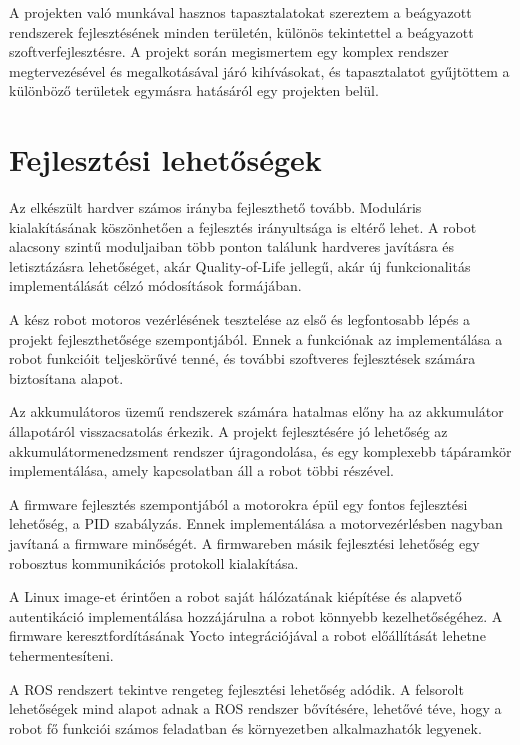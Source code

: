 \medskip

A projekten való munkával hasznos tapasztalatokat szereztem a beágyazott
rendszerek fejlesztésének minden területén, különös tekintettel a beágyazott
szoftverfejlesztésre. A projekt során megismertem egy komplex rendszer
megtervezésével és megalkotásával járó kihívásokat, és tapasztalatot gyűjtöttem a
különböző területek egymásra hatásáról egy projekten belül.

\section{Fejlesztési lehetőségek}

Az elkészült hardver számos irányba fejleszthető tovább. Moduláris kialakításának
köszönhetően a fejlesztés irányultsága is eltérő lehet. A robot alacsony szintű
moduljaiban több ponton találunk hardveres javításra és letisztázásra
lehetőséget, akár Quality-of-Life jellegű, akár új funkcionalitás implementálását
célzó módosítások formájában.

\medskip

A kész robot motoros vezérlésének tesztelése az első és legfontosabb lépés a
projekt fejleszthetősége szempontjából. Ennek a funkciónak az implementálása a
robot funkcióit teljeskörűvé tenné, és további szoftveres fejlesztések számára
biztosítana alapot.

Az akkumulátoros üzemű rendszerek számára hatalmas előny ha az akkumulátor
állapotáról visszacsatolás érkezik. A projekt fejlesztésére jó lehetőség az
akkumulátormenedzsment rendszer újragondolása, és egy komplexebb tápáramkör
implementálása, amely kapcsolatban áll a robot többi részével.

\medskip

A firmware fejlesztés szempontjából a motorokra épül egy fontos fejlesztési
lehetőség, a PID szabályzás. Ennek implementálása a motorvezérlésben nagyban
javítaná a firmware minőségét. A firmwareben másik fejlesztési lehetőség egy
robosztus kommunikációs protokoll kialakítása.

\medskip

A Linux image-et érintően a robot saját hálózatának kiépítése és alapvető
autentikáció implementálása hozzájárulna a robot könnyebb kezelhetőségéhez. A
firmware keresztfordításának Yocto integrációjával a robot előállítását lehetne
tehermentesíteni.

\medskip

A ROS rendszert tekintve rengeteg fejlesztési lehetőség adódik. A felsorolt
lehetőségek mind alapot adnak a ROS rendszer bővítésére, lehetővé téve, hogy a
robot fő funkciói számos feladatban és környezetben alkalmazhatók legyenek.

